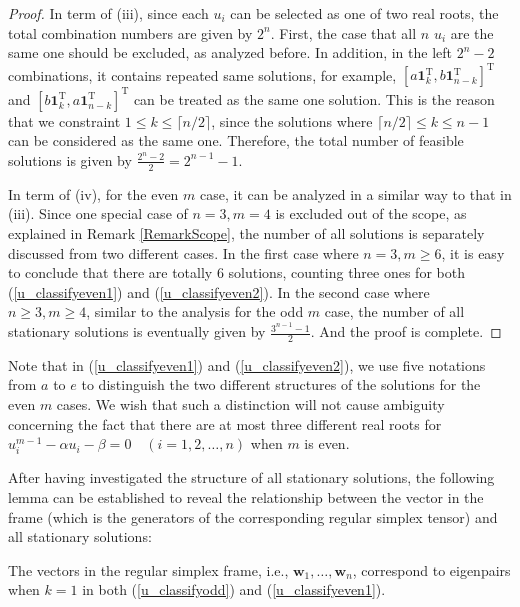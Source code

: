 \begin{proof}
In term of (iii),   
since  each $u_{i}$ can be  selected  as  one  of  two real  roots,
the total combination numbers   are  given by 
$2^{n}$.
First,  
the  case that  
all $n$   
$u_{i}$ are the same one should be  excluded, as analyzed before. 
In addition, 
in the left 
$2^{n}-2$
combinations, 
it contains  repeated  same solutions, for  example, 
$ [
a \mathbf 1_{k}^{\mathrm T},
b \mathbf 1_{n-k}^{\mathrm T}
]^{\mathrm T} $
and 
$ [
b \mathbf 1_{k}^{\mathrm T},
a \mathbf 1_{n-k}^{\mathrm T}
]^{\mathrm T} $
can be treated as the same one solution. 
This is the reason that we constraint $1 \le  k  \le \lceil n/2  \rceil$,
since the solutions
where $\lceil n/2  \rceil  \le  k  \le  n-1$
can be considered as the same one. %
Therefore, the   total  number of 
feasible solutions 
is  given by 
$
\frac{2^{n}-2}{2}
=
2^{n-1}-1$.


In term of (iv),   for the  even $m$  case,  
it can be analyzed in a  similar way to that in (iii).
Since  one special 
case 	 of 		$n = 3, m = 4$ 
is excluded out of the scope,  as 
explained in Remark \ref{RemarkScope},
the number of all  solutions 
is separately discussed    from two different cases. 
In the first case where 
$ n=3, m\ge 6 $, 
it is easy to conclude that 
there are totally 6  solutions, 
counting three ones for both 
(\ref{u_classifyeven1})
and 
(\ref{u_classifyeven2}).
In the second  case where 
$  n \ge  3, m\ge 4 $, 
similar to the analysis for the odd $m$ case, 
 the  number  of 
all stationary  solutions 
is   
eventually 
given by 
$ \frac 
{ 3^{ n-1} - 1}
{2}  $.
And the proof is complete.
\end{proof}

\begin{remark}
	Note that in 
	(\ref{u_classifyeven1})
	and 
	(\ref{u_classifyeven2}),
	we use five notations  from 
	$a$ to $e$ to distinguish 
	the  two  different   structures   of  the solutions for the even $m$ cases. 
	We wish that  such a  distinction 
	will not cause ambiguity 
	concerning the fact that there are at most three different  real roots for 
		$  u_{i}^{m-1} -\alpha u_{i} - \beta =0  \quad  (i=1,2, \dots, n) $
		when $m$ is even. 
\end{remark}

After  having  investigated the structure of all  stationary  solutions, 
the  following lemma can be  established to 
reveal  the  relationship 
between the vector in the frame (which is the generators of the corresponding regular simplex tensor) and 
all stationary solutions: 
\begin{lemma}\label{vectorregularsimplexframe}
	The  vectors   in the regular simplex  frame, i.e., 
	 $ \mathbf{w}_{1}, \ldots, \mathbf{w}_{n}$,
	 correspond  to 
	 eigenpairs when $k=1$  in both   
	 (\ref{u_classifyodd})  and (\ref{u_classifyeven1}). 
	\end{lemma} 


